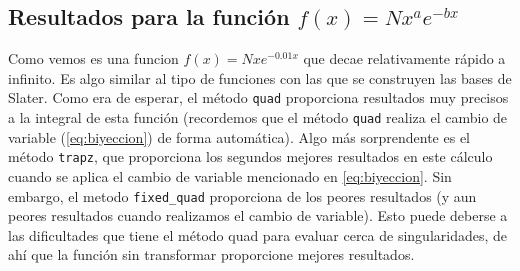\documentclass{article}
\begin{document}
\subsection{Resultados para la función $f(x) = N x^a e^{-bx}$}

Como vemos es una funcion $f(x) = N x e^{-0.01x}$ que decae relativamente rápido a infinito. Es algo similar al tipo de funciones con las que se construyen las bases de Slater. Como era de esperar, el método \texttt{quad} proporciona resultados muy precisos a la integral de esta función (recordemos que el método \texttt{quad} realiza el cambio de variable (\ref{eq:biyeccion}) de forma automática). Algo más sorprendente es el método \texttt{trapz},  que proporciona los segundos mejores resultados en este cálculo cuando se aplica el cambio de variable mencionado en \ref{eq:biyeccion}. Sin embargo, el metodo \texttt{fixed\_quad} proporciona de los peores resultados (y aun peores resultados cuando realizamos el cambio de variable). Esto puede deberse a las dificultades que tiene el método quad para evaluar cerca de singularidades, de ahí que la función sin transformar proporcione mejores resultados.
\end{document}
